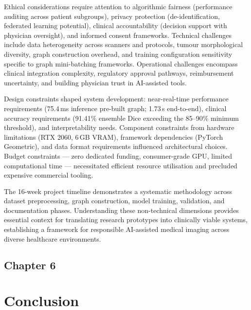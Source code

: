 \documentclass{article}
\begin{document}
Ethical considerations require attention to algorithmic fairness (performance auditing across patient subgroups), privacy protection (de-identification, federated learning potential), clinical accountability (decision support with physician oversight), and informed consent frameworks. Technical challenges include data heterogeneity across scanners and protocols, tumour morphological diversity, graph construction overhead, and training configuration sensitivity specific to graph mini-batching frameworks. Operational challenges encompass clinical integration complexity, regulatory approval pathways, reimbursement uncertainty, and building physician trust in AI-assisted tools.

Design constraints shaped system development: near-real-time performance requirements (75.4\,ms inference pre-built graph; 1.73\,s end-to-end), clinical accuracy requirements (91.41\% ensemble Dice exceeding the 85--90\% minimum threshold), and interpretability needs. Component constraints from hardware limitations (RTX 2060, 6\,GB VRAM), framework dependencies (PyTorch Geometric), and data format requirements influenced architectural choices. Budget constraints — zero dedicated funding, consumer-grade GPU, limited computational time — necessitated efficient resource utilisation and precluded expensive commercial tooling.

The 16-week project timeline demonstrates a systematic methodology across dataset preprocessing, graph construction, model training, validation, and documentation phases. Understanding these non-technical dimensions provides essential context for translating research prototypes into clinically viable systems, establishing a framework for responsible AI-assisted medical imaging across diverse healthcare environments.

\clearpage
\cleardoublepage
\begin{center}
    \section*{\fontsize{20}{20}\selectfont Chapter 6}
\end{center}
\vspace{10mm}

\section{Conclusion}
\end{document}
